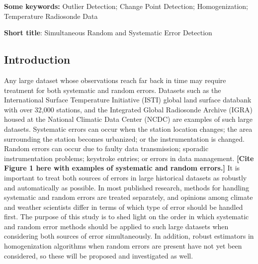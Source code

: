 \documentclass[12pt]{article}
\begin{document}

\begin{singlespacing}
\par\vfill\noindent
{\bf Some keywords:} Outlier Detection; Change Point Detection; Homogenization; Temperature Radiosonde Data

\par\medskip\noindent
{\bf Short title}:  Simultaneous Random and Systematic Error Detection

\end{singlespacing}
\clearpage\pagebreak\newpage {}
\begin{doublespacing}


\section{Introduction}

Any large dataset whose observations reach far back in time may require treatment for both systematic and random errors. Datasets such as the International Surface Temperature Initiative (ISTI) global land surface databank \cite{rennie14} with over 32,000 stations, and the Integrated Global Radiosonde Archive (IGRA) housed at the National Climatic Data Center (NCDC) \cite{durre06} are examples of such large datasets. Systematic errors can occur when the station location changes; the area surrounding the station becomes urbanized; or the instrumentation is changed. Random errors can occur due to faulty data transmission; sporadic instrumentation problems; keystroke entries; or errors in data management. \textbf{[Cite Figure 1 here with examples of systematic and random errors.]} It is important to treat both sources of errors in  large historical datasets as robustly and automatically as possible. In most published research, methods for handling systematic and random errors are treated separately, and opinions among climate and weather scientists differ in terms of which type of error should be handled first. The purpose of this study is to shed light on the order in which systematic and random error methods should be applied to such large datasets when considering both sources of error simultaneously. In addition, robust estimators in homogenization algorithms when random errors are present have not yet been considered, so these will be proposed and investigated as well.


\end{doublespacing}
\end{document}
